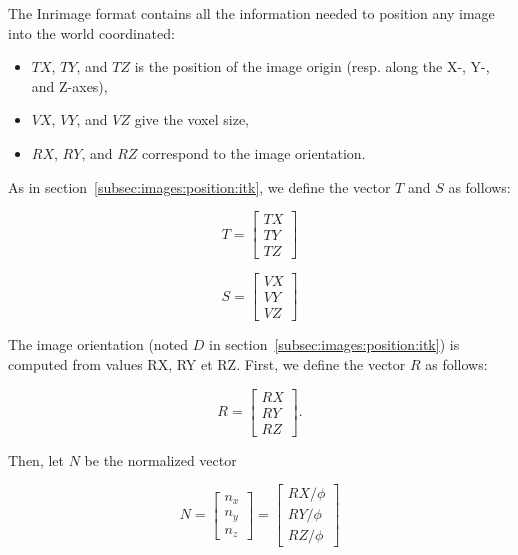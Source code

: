 The Inrimage format contains all the information needed to position any image into the world coordinated:

\begin{itemize}
\item $TX$, $TY$, and $TZ$ is the position of the image origin (resp. along the X-, Y-, and Z-axes),
\item $VX$, $VY$, and $VZ$ give the voxel size,
\item $RX$, $RY$, and $RZ$ correspond to the image orientation.
\end{itemize}

As in section~\ref{subsec:images:position:itk}, we define the vector $T$ and $S$ as follows:

\begin{equation}
T = \begin{bmatrix} TX \\ TY \\ TZ \end{bmatrix}
\end{equation}

\begin{equation}
S = \begin{bmatrix} VX \\ VY \\ VZ \end{bmatrix}
\end{equation}

The image orientation (noted $D$ in section~\ref{subsec:images:position:itk}) is computed from values RX, RY et RZ. First, we define the vector $R$ as follows:

\begin{equation}
R = \begin{bmatrix} RX \\ RY \\ RZ \end{bmatrix}.
\end{equation}

Then, let $N$ be the normalized vector

\begin{equation}
N = \begin{bmatrix} n_x \\ n_y \\ n_z \end{bmatrix}
= \begin{bmatrix} RX/\phi \\ RY/\phi \\ RZ/\phi \end{bmatrix}
\end{equation}


